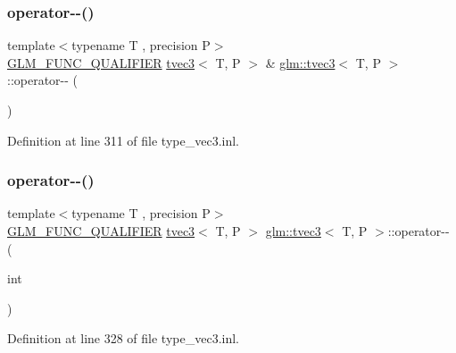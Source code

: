 \mbox{\label{structglm_1_1tvec3_a61447785338db749ad3bdb5c97b8c710}} 
\subsubsection{\texorpdfstring{operator-\/-\/()}{operator--()}\hspace{0.1cm}{\footnotesize\ttfamily [1/2]}}
{\footnotesize\ttfamily template$<$typename T , precision P$>$ \\
\mbox{\hyperlink{setup_8hpp_a33fdea6f91c5f834105f7415e2a64407}{G\+L\+M\+\_\+\+F\+U\+N\+C\+\_\+\+Q\+U\+A\+L\+I\+F\+I\+ER}} \mbox{\hyperlink{structglm_1_1tvec3}{tvec3}}$<$ T, P $>$ \& \mbox{\hyperlink{structglm_1_1tvec3}{glm\+::tvec3}}$<$ T, P $>$\+::operator-\/-\/ (\begin{DoxyParamCaption}{ }\end{DoxyParamCaption})}



Definition at line 311 of file type\+\_\+vec3.\+inl.

\mbox{\label{structglm_1_1tvec3_abc0a890711331ebd0769c133824572bc}} 
\subsubsection{\texorpdfstring{operator-\/-\/()}{operator--()}\hspace{0.1cm}{\footnotesize\ttfamily [2/2]}}
{\footnotesize\ttfamily template$<$typename T , precision P$>$ \\
\mbox{\hyperlink{setup_8hpp_a33fdea6f91c5f834105f7415e2a64407}{G\+L\+M\+\_\+\+F\+U\+N\+C\+\_\+\+Q\+U\+A\+L\+I\+F\+I\+ER}} \mbox{\hyperlink{structglm_1_1tvec3}{tvec3}}$<$ T, P $>$ \mbox{\hyperlink{structglm_1_1tvec3}{glm\+::tvec3}}$<$ T, P $>$\+::operator-\/-\/ (\begin{DoxyParamCaption}\item[{int}]{ }\end{DoxyParamCaption})}



Definition at line 328 of file type\+\_\+vec3.\+inl.

